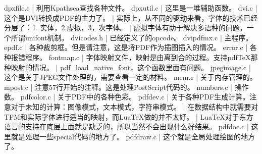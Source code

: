     dpxfile.c | 利用Kpathsea查找各种文件。
    dpxutil.c | 这里是一堆辅助函数。
    dvi.c | 这个是DVI转换成PDF的主力了。
          | 实际上，从不同的驱动来看，字体的技术已经分层了：1. 实体，2.虚拟，3，次字体。
          | 虚拟字体有助于解决多语种的问题，一个所谓unifont机制。
    dvicodes.h | 已经定义了的opcode。
    dvipdfmx.c | 主程序。
    epdf.c | 各种裁剪框。但是请注意，这是将PDF作为插图插入的情况。
    error.c | 各种报错程序。
    fontmap.c | 字体映射文件，映射是由离到合的过程。支持pdfTeX那种映射的情况。
              | pdf_load_native_font，这个函数里面有问题。
    jpegimage.c | 这个是关于JPEG文件处理的，需要查看一定的材料。
    mem.c | 关于内存管理的。
    mpost.c | 注意57行开始的注释。这是处理PostScript代码的。
    numbers.c | 操作数。
    pdfcolor.c | 关于PDF中的各种色彩。
    pdfdev.c | 关于各种PDF生成计算。注意对于未知的计算：图像模式，文本模式，字符串模式。
             | 在数据结构中就需要对TFM和实际字体进行适当的映射，而LuaTeX做的并不太好。
             | LuaTeX对于东方语言的支持在底层上面就是缺乏的，所以当然不会出现什么好结果。
    pdfdoc.c | 这里就是处理一些special代码的地方了。
    pdfdraw.c | 这个就是全局处理绘图的地方了。
    









 
